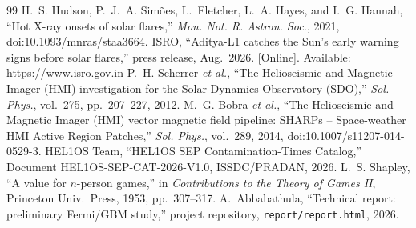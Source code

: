 \documentclass[conference]{IEEEtran}
\begin{document}
\begin{thebibliography}{99}
 H.~S. Hudson, P.~J.~A. Sim\~oes, L.~Fletcher, L.~A. Hayes, and I.~G. Hannah, ``Hot X-ray onsets of solar flares,'' \emph{Mon. Not. R. Astron. Soc.}, 2021, doi:10.1093/mnras/staa3664.
 ISRO, ``Aditya-L1 catches the Sun's early warning signs before solar flares,'' press release, Aug.\ 2026. [Online]. Available: https://www.isro.gov.in
 P.~H. Scherrer \emph{et al.}, ``The Helioseismic and Magnetic Imager (HMI) investigation for the Solar Dynamics Observatory (SDO),'' \emph{Sol. Phys.}, vol.~275, pp.~207--227, 2012.
 M.~G. Bobra \emph{et al.}, ``The Helioseismic and Magnetic Imager (HMI) vector magnetic field pipeline: SHARPs -- Space-weather HMI Active Region Patches,'' \emph{Sol. Phys.}, vol.~289, 2014, doi:10.1007/s11207-014-0529-3.
 HEL1OS Team, ``HEL1OS SEP Contamination-Times Catalog,'' Document HEL1OS-SEP-CAT-2026-V1.0, ISSDC/PRADAN, 2026.
 L.~S. Shapley, ``A value for $n$-person games,'' in \emph{Contributions to the Theory of Games II}, Princeton Univ.\ Press, 1953, pp.~307--317.
 A.~Abbabathula, ``Technical report: preliminary Fermi/GBM study,'' project repository, \texttt{report/report.html}, 2026.
\end{thebibliography}
\end{document}
